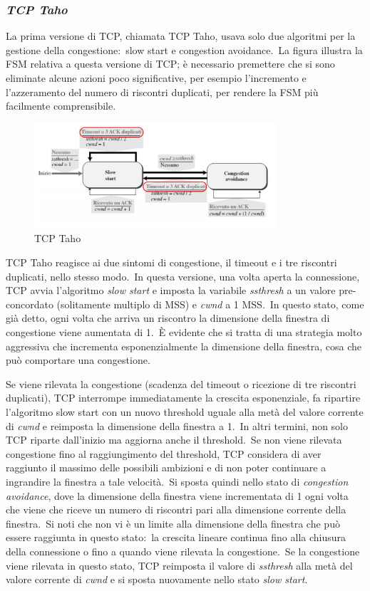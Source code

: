 \subsubsection{\emph{TCP Taho}}

La prima versione di TCP, chiamata TCP Taho, usava solo due algoritmi per la gestione della congestione:\ slow start e congestion avoidance.\
La figura illustra la FSM relativa a questa versione di TCP; è necessario premettere che si sono eliminate alcune azioni poco significative, per esempio l'incremento e l'azzeramento del numero di riscontri duplicati, per rendere la FSM più facilmente comprensibile.

\begin{figure}[H]
    \centering
    \includegraphics[width=0.8\textwidth]{immagini/TCP_Taho.jpg}
    \caption*{TCP Taho}
\end{figure}

TCP Taho reagisce ai due sintomi di congestione, il timeout e i tre riscontri duplicati, nello stesso modo.\
In questa versione, una volta aperta la connessione, TCP avvia l'algoritmo \emph{slow start} e imposta la variabile \emph{ssthresh} a un valore pre-concordato (solitamente multiplo di MSS) e \emph{cwnd} a 1 MSS.\
In questo stato, come già detto, ogni volta che arriva un riscontro la dimensione della finestra di congestione viene aumentata di 1.\
È evidente che si tratta di una strategia molto aggressiva che incrementa esponenzialmente la dimensione della finestra, cosa che può comportare una congestione.

Se viene rilevata la congestione (scadenza del timeout o ricezione di tre riscontri duplicati), TCP interrompe immediatamente la crescita esponenziale, fa ripartire l'algoritmo slow start con un nuovo threshold uguale alla metà del valore corrente di \emph{cwnd} e reimposta la dimensione della finestra a 1.\
In altri termini, non solo TCP riparte dall'inizio ma aggiorna anche il threshold.\
Se non viene rilevata congestione fino al raggiungimento del threshold, TCP considera di aver raggiunto il massimo delle possibili ambizioni e di non poter continuare a ingrandire la finestra a tale velocità.\
Si sposta quindi nello stato di \emph{congestion avoidance}, dove la dimensione della finestra viene incrementata di 1 ogni volta che viene che riceve un numero di riscontri pari alla dimensione corrente della finestra.\
Si noti che non vi è un limite alla dimensione della finestra che può essere raggiunta in questo stato:\ la crescita lineare continua fino alla chiusura della connessione o fino a quando viene rilevata la congestione.\
Se la congestione viene rilevata in questo stato, TCP reimposta il valore di \emph{ssthresh} alla metà del valore corrente di \emph{cwnd} e si sposta nuovamente nello stato \emph{slow start}.

